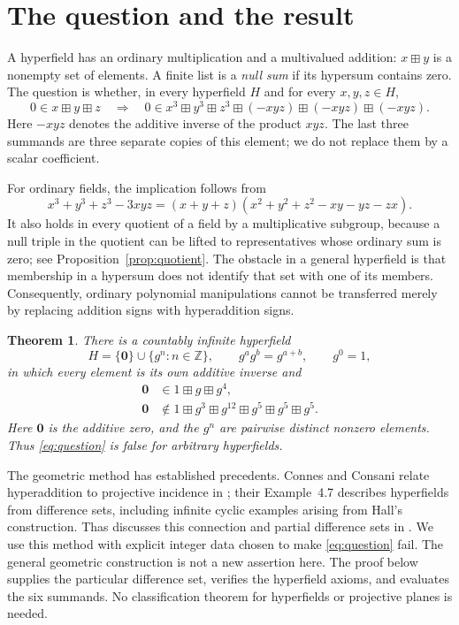 \documentclass[11pt]{article}
\newtheorem{theorem}{Theorem}[section]
\theoremstyle{remark}
\newcommand{\Z}{\mathbb Z}
\newcommand{\hz}{\mathbf 0}
\newcommand{\hs}{\boxplus}
\begin{document}
\section{The question and the result}

A hyperfield has an ordinary multiplication and a multivalued addition:
$x\hs y$ is a nonempty set of elements. A finite list is a
\emph{null sum} if its hypersum contains zero. The question is whether,
in every hyperfield $H$ and for every $x,y,z\in H$,
\begin{equation}\label{eq:question}
 0\in x\hs y\hs z
 \quad\Longrightarrow\quad
 0\in x^3\hs y^3\hs z^3\hs(-xyz)\hs(-xyz)\hs(-xyz).
\end{equation}
Here $-xyz$ denotes the additive inverse of the product $xyz$.
The last three summands are three separate copies of this element;
we do not replace them by a scalar coefficient.

For ordinary fields, the implication follows from
\begin{equation}\label{eq:field-identity}
 x^3+y^3+z^3-3xyz
 =(x+y+z)(x^2+y^2+z^2-xy-yz-zx).
\end{equation}
It also holds in every quotient of a field by a multiplicative subgroup,
because a null triple in the quotient can be lifted to representatives
whose ordinary sum is zero; see Proposition~\ref{prop:quotient}.
The obstacle in a general hyperfield is that membership in a hypersum
does not identify that set with one of its members. Consequently,
ordinary polynomial manipulations cannot be transferred merely by
replacing addition signs with hyperaddition signs.

\begin{theorem}\label{thm:main}
There is a countably infinite hyperfield
\[
 H=\{\hz\}\cup\{g^n:n\in\Z\},\qquad
 g^ag^b=g^{a+b},\qquad g^0=1,
\]
in which every element is its own additive inverse and
\begin{align}
 \hz&\in 1\hs g\hs g^4,\label{eq:witness-premise}\\
 \hz&\notin 1\hs g^3\hs g^{12}\hs g^5\hs g^5\hs g^5.
 \label{eq:witness-failure}
\end{align}
Here $\hz$ is the additive zero, and the $g^n$ are pairwise distinct
nonzero elements. Thus \eqref{eq:question} is false for arbitrary
hyperfields.
\end{theorem}

The geometric method has established precedents. Connes and Consani
relate hyperaddition to projective incidence in
\cite[Proposition~3.1 and Lemma~3.5]{CC}; their
Example~4.7 describes hyperfields from difference sets, including
infinite cyclic examples arising from Hall's construction.
Thas discusses this connection and partial difference sets in
\cite[Sections~2.2--2.3 and 4.1]{Thas}.
We use this method with explicit integer data chosen to make
\eqref{eq:question} fail. The general geometric construction is not a
new assertion here. The proof below supplies the particular difference
set, verifies the hyperfield axioms, and evaluates the six summands.
No classification theorem for hyperfields or projective planes is needed.
\end{document}
